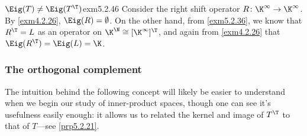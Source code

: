 \begin{exm}{$\Eig (T)\neq \Eig (T^{\T})$}{exm5.2.46}
	Consider the right shift operator $R\colon \K ^{\infty}\rightarrow \K ^{\infty}$.  By \cref{exm4.2.26}, $\Eig (R)=\emptyset$.  On the other hand, from \cref{exm5.2.36}, we know that $R^{\T}=L$ as an operator on $\K ^{\N}\cong [\K ^{\infty}]^{\T}$, and again from \cref{exm4.2.26} that $\Eig (R^{\T})=\Eig (L)=\K$.
\end{exm}

\subsubsection{The orthogonal complement}

The intuition behind the following concept will likely be easier to understand when we begin our study of inner-product spaces, though one can see it's usefulness easily enough:  it allows us to related the kernel and image of $T^{\T}$ to that of $T$---see \cref{prp5.2.21}.
